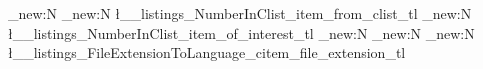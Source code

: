 \ExplSyntaxOn
    \int_new:N \numberinclist
      \tl_new:N \l__listings_NumberInClist_item_from_clist_tl
      \tl_new:N \l__listings_NumberInClist_item_of_interest_tl
      \tl_new:N \displayedname
      \tl_new:N \pygmentsname
      \tl_new:N \l__listings_FileExtensionToLanguage_citem_file_extension_tl
